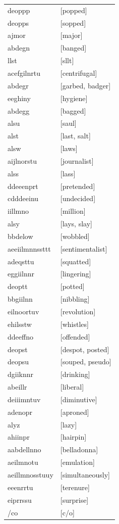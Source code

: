 \documentclass{article}
\begin{document}
\begin{tabular}{ll}
deoppp & [popped] \\
deopps & [sopped] \\
ajmor & [major] \\
abdegn & [banged] \\
llst & [sllt] \\
acefgilnrtu & [centrifugal] \\
abdegr & [garbed, badger] \\
eeghiny & [hygiene] \\
abdegg & [bagged] \\
alsu & [saul] \\
alst & [last, salt] \\
alsw & [laws] \\
aijlnorstu & [journalist] \\
alss & [lass] \\
ddeeenprt & [pretended] \\
cdddeeinu & [undecided] \\
iillmno & [million] \\
alsy & [lays, slay] \\
bbdelow & [wobbled] \\
aeeiilmnnssttt & [sentimentalist] \\
adeqsttu & [squatted] \\
eggiilnnr & [lingering] \\
deoptt & [potted] \\
bbgiilnn & [nibbling] \\
eilnoortuv & [revolution] \\
ehilsstw & [whistles] \\
ddeeffno & [offended] \\
deopst & [despot, posted] \\
deopsu & [souped, pseudo] \\
dgiiknnr & [drinking] \\
abeillr & [liberal] \\
deiiimntuv & [diminutive] \\
adenopr & [aproned] \\
alyz & [lazy] \\
ahiinpr & [hairpin] \\
aabdellnno & [belladonna] \\
aeilmnotu & [emulation] \\
aeillmnosstuuy & [simultaneously] \\
eeenrrtu & [terenure] \\
eiprrssu & [surprise] \\
/co & [c/o] \\

\end{tabular}
\end{document}

